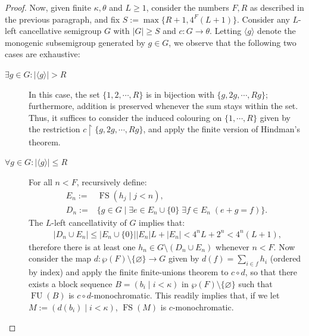 \documentclass[10pt,a4paper]{amsart}
\begin{document}
\begin{proof}
    Now, given finite $\kappa, \theta$ and $L\geq1$, consider the numbers $F, R$ as described in the previous paragraph, and fix $S:=\max\{R+1, 4^{F}(L+1)\}$.
    Consider any $L$-left cancellative semigroup $G$ with $|G|\geq S$ and $c:G\longrightarrow\theta$. Letting $\langle g\rangle$ denote the monogenic subsemigroup generated by $g\in G$, we observe that the following two cases are exhaustive:
    \begin{description}
        \item[$\exists g\in G:|\langle g\rangle|>R$]
            In this case, the set $\{1, 2, \cdots, R\}$ is in bijection with $\{g, 2g, \cdots, Rg\}$; furthermore, addition is preserved whenever the sum stays within the set. Thus, it suffices to consider the induced colouring on $\{1,\cdots,R\}$ given by the restriction $c\upharpoonright\{g,2g,\cdots,Rg\}$, and apply the finite version of Hindman's theorem.
        \item[$\forall g\in G:|\langle g\rangle|\leq R$] 
            For all $n<F$, recursively define:
            \begin{align*}
                E_{n}:=&\operatorname{FS}(h_{j}\mid j<n),\\
                D_{n}:=&\{g\in G\mid\exists e\in E_{n}\cup\{0\}\;\exists f\in E_{n}\;(e+g=f)\}.
            \end{align*}
            The $L$-left cancellativity of $G$ implies that:
            \begin{align*}\;
                |D_{n}\cup E_{n}|\leq
                |E_{n}\cup\{0\}||E_n|L+|E_n|<
                4^{n}L+2^{n}<
                4^{n}(L+1),
            \end{align*}
            therefore there is at least one $h_{n}\in G\setminus(D_{n}\cup E_{n})$ whenever $n<F$.
            Now consider the map $d:\wp(F)\setminus\{\varnothing\}\to G$ given by $d(f)=\sum_{i\in f}h_{i}$ (ordered by index) and apply the finite finite-unions theorem to $c\circ d$, so that there exists a block sequence $B=(b_{i}\mid i<\kappa)$ in $\wp(F)\setminus\{\varnothing\}$ such that $\operatorname{FU}(B)$ is $c\circ d$-monochromatic. This readily implies that, if we let $M:=(d(b_{i})\mid i<\kappa)$, $\operatorname{FS}(M)$ is $c$-monochromatic. \qedhere
    \end{description}
\end{proof}
\end{document}
